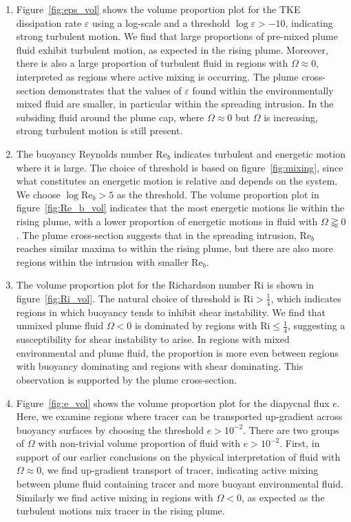\documentclass[a4paper]{article}
\begin{document}
\begin{enumerate}[label=(\alph*)]
	\item Figure~\ref{fig:eps_vol} shows the volume proportion plot for the TKE dissipation rate $\varepsilon$
		using a log-scale and a threshold $\log \varepsilon > -10$, indicating strong turbulent motion. We
		find that large proportions of pre-mixed plume fluid exhibit turbulent motion, as expected in the rising
		plume. Moreover, there is also a large proportion of turbulent fluid in regions with $\Omega \approx
		0$, interpreted as regions where active mixing is occurring. The plume cross-section demonstrates that
		the values of $\varepsilon$ found within the environmentally mixed fluid are smaller, in particular
		within the spreading intrusion. In the subsiding fluid around the plume cap, where $\Omega \approx 0$
		but $\Omega$ is increasing, strong turbulent motion is still present.

	\item The buoyancy Reynolds number $\mathrm{Re}_b$ indicates turbulent and energetic motion where it is
		large. The choice of threshold is based on figure~\ref{fig:mixing}, since what constitutes an
		energetic motion is relative and depends on the system. We choose $\log \mathrm{Re}_b > 5$ as the
		threshold. The volume proportion plot in figure~\ref{fig:Re_b_vol} indicates that the most energetic
		motions lie within the rising plume, with a lower proportion of energetic motions in fluid with
		$\Omega \gtrapprox 0$. The plume cross-section suggests that in the spreading intrusion,
		$\mathrm{Re}_b$ reaches similar maxima to within the rising plume, but there are also more regions
		within the intrusion with smaller $\mathrm{Re}_b$.

	\item The volume proportion plot for the Richardson number $\mathrm{Ri}$ is shown in
		figure~\ref{fig:Ri_vol}. The natural choice of threshold is $\mathrm{Ri} > \frac{1}{4}$, which
		indicates regions in which buoyancy tends to inhibit shear instability. We find that unmixed plume
		fluid $\Omega < 0$ is dominated by regions with $\mathrm{Ri} \le \frac{1}{4}$, suggesting
		a susceptibility for shear instability to arise. In regions with mixed environmental and plume fluid,
		the proportion is more even between regions with buoyancy dominating and regions with shear
		dominating. This observation is supported by the plume cross-section.

	\item Figure~\ref{fig:e_vol} shows the volume proportion plot for the diapycnal flux $e$. Here, we examine
		regions where tracer can be transported up-gradient across buoyancy surfaces by choosing the threshold
		$e > 10^{-2}$. There are two groups of $\Omega$ with non-trivial volume proportion of fluid with $e >
		10^{-2}$. First, in support of our earlier conclusions on the physical interpretation of fluid with
		$\Omega \approx 0$, we find up-gradient transport of tracer, indicating active mixing between plume
		fluid containing tracer and more buoyant environmental fluid. Similarly we find active mixing in
		regions with $\Omega < 0$, as expected as the turbulent motions mix tracer in the rising plume.
\end{enumerate}
\end{document}
